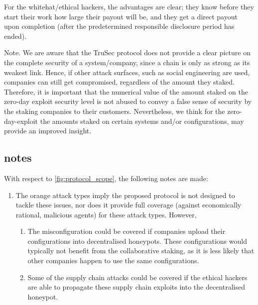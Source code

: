 For the whitehat/ethical hackers, the advantages are clear; they know before they start their work how large their payout will be, and they get a direct payout upon completion (after the predetermined responsible disclosure period has ended).

Note. We are aware that the TruSec protocol does not provide a clear picture on the complete security of a system/company, since a chain is only as strong as its weakest link. Hence, if other attack surfaces, such as social engineering are used, companies can still get compromised, regardless of the amount they staked. Therefore, it is important that the numerical value of the amount staked on the zero-day exploit security level is not abused to convey a false sense of security by the staking companies to their customers. Nevertheless, we think for the zero-day-exploit the amounts staked on certain systems and/or configurations, may provide an improved insight.
\subsection{ notes}
With respect to \cref{fig:protocol_scope}, the following notes are made:
\begin{enumerate} 
    \item The orange attack types imply the proposed protocol is not designed to tackle these issues, nor does it provide full coverage (against economically rational, malicious agents) for these attack types. However,
    \begin{enumerate}
        \item The misconfiguration could be covered if companies upload their configurations into decentralised honeypots. These configurations would typically not benefit from the collaborative staking, as it is less likely that other companies happen to use the same configurations.
        \item Some of the supply chain attacks could be covered if the ethical hackers are able to propagate these supply chain exploits into the decentralised honeypot.
    \end{enumerate}
\end{enumerate}

